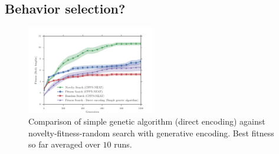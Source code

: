 \documentclass{sig-alternate}
\begin{document}

\subsection{Behavior selection?} 


\begin{figure}[t!]
\centering
\includegraphics[width=0.5\textwidth]{../Figures/Results/FitNovRandomDirectSize5.pdf}
\caption{Comparison of simple genetic algorithm (direct encoding) against novelty-fitness-random search with generative encoding. Best fitness so far averaged over $10$ runs.}
\label{fig:FitNovRandomDirectSize5}
\end{figure}
\end{document}
